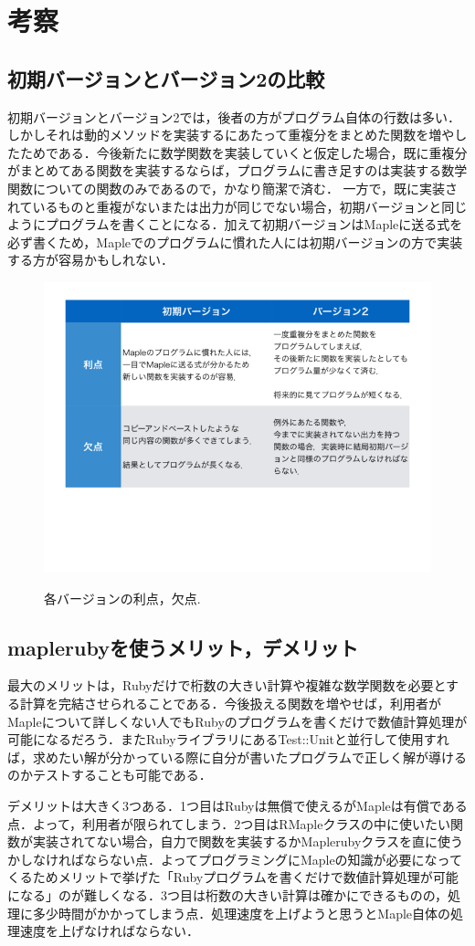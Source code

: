 \section{考察}
\subsection{初期バージョンとバージョン2の比較}
初期バージョンとバージョン2では，後者の方がプログラム自体の行数は多い．しかしそれは動的メソッドを実装するにあたって重複分をまとめた関数を増やしたためである．今後新たに数学関数を実装していくと仮定した場合，既に重複分がまとめてある関数を実装するならば，プログラムに書き足すのは実装する数学関数についての関数のみであるので，かなり簡潔で済む．
一方で，既に実装されているものと重複がないまたは出力が同じでない場合，初期バージョンと同じようにプログラムを書くことになる．加えて初期バージョンはMapleに送る式を必ず書くため，Mapleでのプログラムに慣れた人には初期バージョンの方で実装する方が容易かもしれない．

\begin{figure}[htbp]\begin{center}
\includegraphics[width=12cm,bb= 0 0 937 753]{../figs/./mapleruby_eringi.009.png}
\caption{各バージョンの利点，欠点.}
\label{figure:eight}
\label{default}\end{center}\end{figure}
\subsection{maplerubyを使うメリット，デメリット}
最大のメリットは，Rubyだけで桁数の大きい計算や複雑な数学関数を必要とする計算を完結させられることである．今後扱える関数を増やせば，利用者がMapleについて詳しくない人でもRubyのプログラムを書くだけで数値計算処理が可能になるだろう．またRubyライブラリにあるTest::Unitと並行して使用すれば，求めたい解が分かっている際に自分が書いたプログラムで正しく解が導けるのかテストすることも可能である．

デメリットは大きく3つある．1つ目はRubyは無償で使えるがMapleは有償である点．よって，利用者が限られてしまう．2つ目はRMapleクラスの中に使いたい関数が実装されてない場合，自力で関数を実装するかMaplerubyクラスを直に使うかしなければならない点．よってプログラミングにMapleの知識が必要になってくるためメリットで挙げた「Rubyプログラムを書くだけで数値計算処理が可能になる」のが難しくなる．3つ目は桁数の大きい計算は確かにできるものの，処理に多少時間がかかってしまう点．処理速度を上げようと思うとMaple自体の処理速度を上げなければならない．


